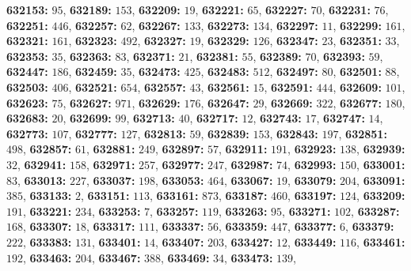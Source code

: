 \textsf{\bfseries 632153:} $95$, \textsf{\bfseries 632189:} $153$, \textsf{\bfseries 632209:} $19$, \textsf{\bfseries 632221:} $65$, \textsf{\bfseries 632227:} $70$, \textsf{\bfseries 632231:} $76$, \textsf{\bfseries 632251:} $446$, \textsf{\bfseries 632257:} $62$, \textsf{\bfseries 632267:} $133$, \textsf{\bfseries 632273:} $134$, \textsf{\bfseries 632297:} $11$, \textsf{\bfseries 632299:} $161$, \textsf{\bfseries 632321:} $161$, \textsf{\bfseries 632323:} $492$, \textsf{\bfseries 632327:} $19$, \textsf{\bfseries 632329:} $126$, \textsf{\bfseries 632347:} $23$, \textsf{\bfseries 632351:} $33$, \textsf{\bfseries 632353:} $35$, \textsf{\bfseries 632363:} $83$, \textsf{\bfseries 632371:} $21$, \textsf{\bfseries 632381:} $55$, \textsf{\bfseries 632389:} $70$, \textsf{\bfseries 632393:} $59$, \textsf{\bfseries 632447:} $186$, \textsf{\bfseries 632459:} $35$, \textsf{\bfseries 632473:} $425$, \textsf{\bfseries 632483:} $512$, \textsf{\bfseries 632497:} $80$, \textsf{\bfseries 632501:} $88$, \textsf{\bfseries 632503:} $406$, \textsf{\bfseries 632521:} $654$, \textsf{\bfseries 632557:} $43$, \textsf{\bfseries 632561:} $15$, \textsf{\bfseries 632591:} $444$, \textsf{\bfseries 632609:} $101$, \textsf{\bfseries 632623:} $75$, \textsf{\bfseries 632627:} $971$, \textsf{\bfseries 632629:} $176$, \textsf{\bfseries 632647:} $29$, \textsf{\bfseries 632669:} $322$, \textsf{\bfseries 632677:} $180$, \textsf{\bfseries 632683:} $20$, \textsf{\bfseries 632699:} $99$, \textsf{\bfseries 632713:} $40$, \textsf{\bfseries 632717:} $12$, \textsf{\bfseries 632743:} $17$, \textsf{\bfseries 632747:} $14$, \textsf{\bfseries 632773:} $107$, \textsf{\bfseries 632777:} $127$, \textsf{\bfseries 632813:} $59$, \textsf{\bfseries 632839:} $153$, \textsf{\bfseries 632843:} $197$, \textsf{\bfseries 632851:} $498$, \textsf{\bfseries 632857:} $61$, \textsf{\bfseries 632881:} $249$, \textsf{\bfseries 632897:} $57$, \textsf{\bfseries 632911:} $191$, \textsf{\bfseries 632923:} $138$, \textsf{\bfseries 632939:} $32$, \textsf{\bfseries 632941:} $158$, \textsf{\bfseries 632971:} $257$, \textsf{\bfseries 632977:} $247$, \textsf{\bfseries 632987:} $74$, \textsf{\bfseries 632993:} $150$, \textsf{\bfseries 633001:} $83$, \textsf{\bfseries 633013:} $227$, \textsf{\bfseries 633037:} $198$, \textsf{\bfseries 633053:} $464$, \textsf{\bfseries 633067:} $19$, \textsf{\bfseries 633079:} $204$, \textsf{\bfseries 633091:} $385$, \textsf{\bfseries 633133:} $2$, \textsf{\bfseries 633151:} $113$, \textsf{\bfseries 633161:} $873$, \textsf{\bfseries 633187:} $460$, \textsf{\bfseries 633197:} $124$, \textsf{\bfseries 633209:} $191$, \textsf{\bfseries 633221:} $234$, \textsf{\bfseries 633253:} $7$, \textsf{\bfseries 633257:} $119$, \textsf{\bfseries 633263:} $95$, \textsf{\bfseries 633271:} $102$, \textsf{\bfseries 633287:} $168$, \textsf{\bfseries 633307:} $18$, \textsf{\bfseries 633317:} $111$, \textsf{\bfseries 633337:} $56$, \textsf{\bfseries 633359:} $447$, \textsf{\bfseries 633377:} $6$, \textsf{\bfseries 633379:} $222$, \textsf{\bfseries 633383:} $131$, \textsf{\bfseries 633401:} $14$, \textsf{\bfseries 633407:} $203$, \textsf{\bfseries 633427:} $12$, \textsf{\bfseries 633449:} $116$, \textsf{\bfseries 633461:} $192$, \textsf{\bfseries 633463:} $204$, \textsf{\bfseries 633467:} $388$, \textsf{\bfseries 633469:} $34$, \textsf{\bfseries 633473:} $139$, 
